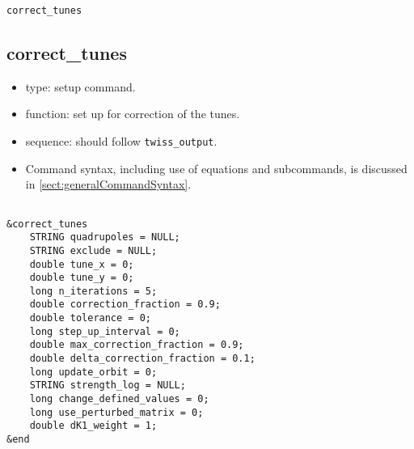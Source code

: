 \documentclass[11pt]{article}
\begin{document}
\newpage
\begin{center}{\Large\verb|correct_tunes|}\end{center}
\subsection{correct\_tunes \label{subsec:correcttunes}}

\begin{itemize}
\item type: setup command.
\item function: set up for correction of the tunes.
\item sequence: should follow \verb|twiss_output|.
\item Command syntax, including use of equations and subcommands, is discussed in \ref{sect:generalCommandSyntax}.
\end{itemize}

\begin{verbatim}

&correct_tunes
    STRING quadrupoles = NULL;
    STRING exclude = NULL;
    double tune_x = 0;
    double tune_y = 0;
    long n_iterations = 5;
    double correction_fraction = 0.9;
    double tolerance = 0;
    long step_up_interval = 0;
    double max_correction_fraction = 0.9;
    double delta_correction_fraction = 0.1;
    long update_orbit = 0;
    STRING strength_log = NULL;
    long change_defined_values = 0;
    long use_perturbed_matrix = 0;
    double dK1_weight = 1;
&end
\end{verbatim}
\end{document}
